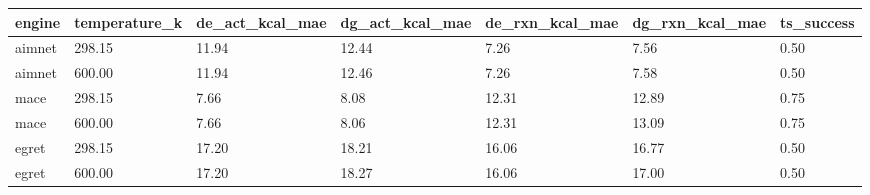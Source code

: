 \begin{tabular}{lllllll}
\hline
engine & temperature\_k & de\_act\_kcal\_mae & dg\_act\_kcal\_mae & de\_rxn\_kcal\_mae & dg\_rxn\_kcal\_mae & ts\_success \\
\hline
aimnet & 298.15 & 11.94 & 12.44 & 7.26 & 7.56 & 0.50 \\
aimnet & 600.00 & 11.94 & 12.46 & 7.26 & 7.58 & 0.50 \\
mace & 298.15 & 7.66 & 8.08 & 12.31 & 12.89 & 0.75 \\
mace & 600.00 & 7.66 & 8.06 & 12.31 & 13.09 & 0.75 \\
egret & 298.15 & 17.20 & 18.21 & 16.06 & 16.77 & 0.50 \\
egret & 600.00 & 17.20 & 18.27 & 16.06 & 17.00 & 0.50 \\
\hline
\end{tabular}
